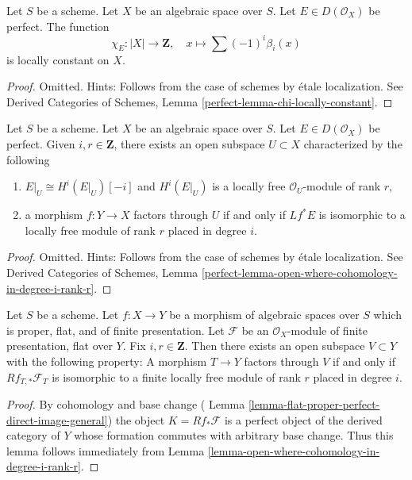 \begin{lemma}
\label{lemma-chi-locally-constant}
Let $S$ be a scheme. Let $X$ be an algebraic space over $S$.
Let $E \in D(\mathcal{O}_X)$ be perfect. The function
$$
\chi_E : |X| \longrightarrow \mathbf{Z},\quad
x \longmapsto \sum (-1)^i \beta_i(x)
$$
is locally constant on $X$.
\end{lemma}

\begin{proof}
Omitted. Hints:
Follows from the case of schemes by \'etale localization. See
Derived Categories of Schemes, Lemma \ref{perfect-lemma-chi-locally-constant}.
\end{proof}

\begin{lemma}
\label{lemma-open-where-cohomology-in-degree-i-rank-r}
Let $S$ be a scheme. Let $X$ be an algebraic space over $S$.
Let $E \in D(\mathcal{O}_X)$ be perfect.
Given $i, r \in \mathbf{Z}$, there exists an
open subspace $U \subset X$ characterized by the following
\begin{enumerate}
\item $E|_U \cong H^i(E|_U)[-i]$ and $H^i(E|_U)$ is a locally free
$\mathcal{O}_U$-module of rank $r$,
\item a morphism $f : Y \to X$ factors through $U$ if and only if
$Lf^*E$ is isomorphic to a locally free module of rank $r$
placed in degree $i$.
\end{enumerate}
\end{lemma}

\begin{proof}
Omitted. Hints:
Follows from the case of schemes by \'etale localization. See
Derived Categories of Schemes, Lemma
\ref{perfect-lemma-open-where-cohomology-in-degree-i-rank-r}.
\end{proof}

\begin{lemma}
\label{lemma-open-where-cohomology-in-degree-i-rank-r-geometric}
Let $S$ be a scheme.
Let $f : X \to Y$ be a morphism of algebraic spaces over $S$
which is proper, flat, and of finite presentation.
Let $\mathcal{F}$ be an $\mathcal{O}_X$-module of finite presentation,
flat over $Y$. Fix $i, r \in \mathbf{Z}$.
Then there exists an open subspace
$V \subset Y$ with the following property:
A morphism $T \to Y$ factors through $V$ if and only if
$Rf_{T, *}\mathcal{F}_T$ is isomorphic to a
finite locally free module of rank $r$ placed in degree $i$.
\end{lemma}

\begin{proof}
By cohomology and base change (
Lemma \ref{lemma-flat-proper-perfect-direct-image-general})
the object $K = Rf_*\mathcal{F}$ is a perfect object of the derived
category of $Y$ whose formation commutes with arbitrary base change.
Thus this lemma follows immediately from
Lemma \ref{lemma-open-where-cohomology-in-degree-i-rank-r}.
\end{proof}

